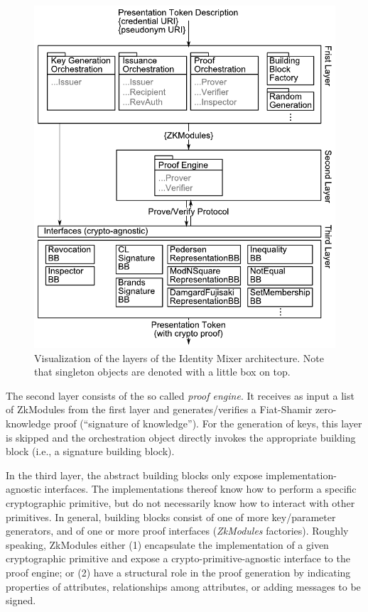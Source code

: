 \begin{figure}[htbp]
\includegraphics[width=\textwidth]{img/idmx_overview.pdf}
\caption{Visualization of the layers of the Identity Mixer architecture.
Note that singleton objects are denoted with a little box on top.}
\label{fig:overview}
\end{figure}

The second layer consists of the so called \emph{proof engine}. It receives as input a list of
ZkModules from the first layer
and generates/verifies a Fiat-Shamir zero-knowledge proof (``signature of knowledge'').
For the generation of keys, this layer is skipped and the orchestration object directly invokes the 
appropriate building block (i.e., a signature building block).


In the third layer, the abstract building blocks
only expose implementation-agnostic interfaces.
The implementations thereof know how to perform a specific cryptographic primitive, but do
not necessarily know how to interact with other primitives.
%
In general, building
blocks consist of one of more key/parameter generators, and of one
or more proof interfaces (\emph{ZkModules} factories).
%
Roughly speaking, ZkModules either (1) encapsulate the implementation of a given 
cryptographic primitive and expose a
crypto-primitive-agnostic interface to the proof engine;
or (2) have a structural role in the proof generation by indicating properties of attributes, 
relationships among attributes,
or adding messages to be signed.



